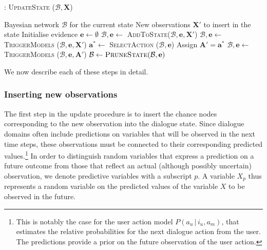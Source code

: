 \begin{algorithm}[h]
\caption{: \textsc{UpdateState} ($\mathcal{B}, \mathbf{X}$)}
\begin{algorithmic}[1] \vspace{1mm}
\REQUIRE Bayesian network $\mathcal{B}$ for the current state
\REQUIRE New observations $\mathbf{X}'$ to insert in the state \vspace{1mm}
\STATE Initialise evidence $\mathbf{e} \leftarrow \emptyset$
\STATE $\mathcal{B}, \mathbf{e} \leftarrow $ \textsc{AddToState}($\mathcal{B}, \mathbf{e}, \mathbf{X}'$)
\STATE $\mathcal{B}, \mathbf{e} \leftarrow$ \textsc{TriggerModels} ($\mathcal{B}, \mathbf{e},  \mathbf{X}'$) \vspace{1mm}
\STATE $\mathbf{a}^* \leftarrow $ \textsc{SelectAction} ($\mathcal{B}, \mathbf{e}$)
\STATE Assign $\mathbf{A}' = \mathbf{a}^*$
\STATE $\mathcal{B}, \mathbf{e} \leftarrow$ \textsc{TriggerModels} ($\mathcal{B}, \mathbf{e}, \mathbf{A}'$)
\ENDWHILE \vspace{1mm}
\STATE $\mathcal{B} \leftarrow \textsc{PruneState} (\mathcal{B}, \mathbf{e})$ \vspace{1mm}
\end{algorithmic}
\label{algo:stateupdate}
\end{algorithm}

We now describe each of these steps in detail.


\subsubsection*{Inserting new observations}

The first step in the update procedure is to insert the chance nodes corresponding to the new observation into the dialogue state. Since dialogue domains often include predictions on variables that will be observed in the next time steps, these observations must be connected to their corresponding predicted values.\footnote{This is notably the case for the user action model $P(a_u \, | \, i_u, a_m)$, that estimates the relative probabilities for the next dialogue action from the user. The predictions provide a prior on the future observation of the user action.} In order to distinguish random variables that express a prediction on a future outcome from those that reflect an actual (although possibly uncertain) observation, we denote predictive variables with a subscript $p$. A variable $X_p$ thus represents a random variable on the predicted values of the variable $X$ to be observed in the future. 

